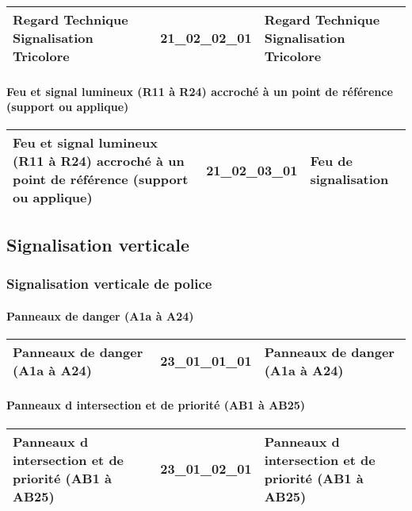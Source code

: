 \documentclass[12pt,titlepage,oneside]{book}
\begin{document}
\renewcommand{\arraystretch}{1.2}
\begin{supertabular}{|p{10cm}|c|p{15cm}|}
 Regard Technique Signalisation Tricolore & 21\_02\_02\_01 & Regard Technique Signalisation Tricolore\\
\hline
\end{supertabular}


\paragraph{Feu et signal lumineux (R11 à R24) accroché à un point de référence (support ou applique)}
\noindent
\vspace{\baselineskip}

\renewcommand{\arraystretch}{1.2}
\begin{supertabular}{|p{10cm}|c|p{15cm}|}
 Feu et signal lumineux (R11 à R24) accroché à un point de référence (support ou applique) & 21\_02\_03\_01 & Feu de signalisation\\
\hline
\end{supertabular}
\subsection{Signalisation verticale}
\subsubsection{\large Signalisation verticale de police}
\paragraph{Panneaux de danger (A1a à A24)}
\noindent
\vspace{\baselineskip}

\renewcommand{\arraystretch}{1.2}
\begin{supertabular}{|p{10cm}|c|p{15cm}|}
 Panneaux de danger (A1a à A24) & 23\_01\_01\_01 & Panneaux de danger (A1a à A24)\\
\hline
\end{supertabular}


\paragraph{Panneaux d intersection et de priorité (AB1 à AB25)}
\noindent
\vspace{\baselineskip}

\renewcommand{\arraystretch}{1.2}
\begin{supertabular}{|p{10cm}|c|p{15cm}|}
 Panneaux d intersection et de priorité (AB1 à AB25) & 23\_01\_02\_01 & Panneaux d intersection et de priorité (AB1 à AB25)\\
\hline
\end{supertabular}
\end{document}
